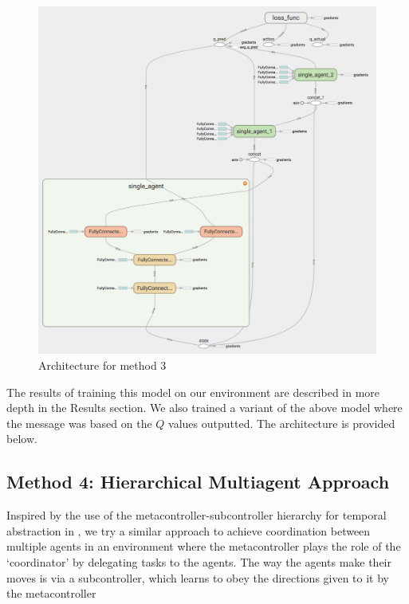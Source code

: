 \documentclass{article}
\begin{document}
\begin{figure}[H]
\centering
\includegraphics[scale=0.15]{message_passing.png}
\caption{Architecture for method 3}
\end{figure}

The results of training this model on our environment are described
in more depth in the Results section. We also trained a variant of
the above model where the message was based on the $Q$ values outputted.
The architecture is provided below.



\subsection{Method 4: Hierarchical Multiagent Approach}
Inspired by the use of the metacontroller-subcontroller
hierarchy for temporal abstraction in \cite{kulkarni2016hierarchical}, we try a similar approach
to achieve coordination between multiple agents in an
environment where the metacontroller plays the role of the `coordinator' by delegating
tasks to the agents. The way the agents make their moves is via a subcontroller,
which learns to obey the directions given to it by the metacontroller
\end{document}
